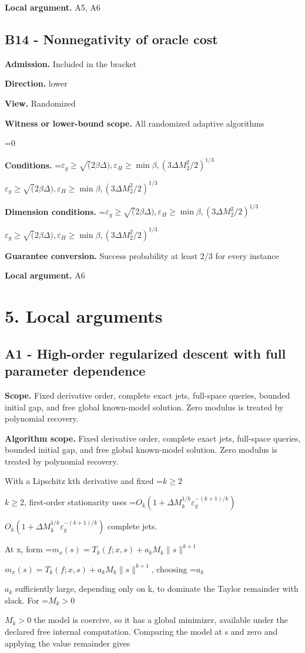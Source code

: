 \documentclass[10pt,a4paper]{article}
\newcommand{\AtlasMath}[1]{\par\begingroup\centering\setbox0=\hbox{$\displaystyle #1$}\ifdim\wd0>1.4\linewidth\typeout{ATLAS WIDE FORMULA: \the\wd0}\fi\ifdim\wd0>\linewidth\resizebox{\linewidth}{!}{\box0}\else\box0\fi\par\endgroup}
\newcommand{\AtlasInlineMath}[1]{\begingroup\setbox0=\hbox{$#1$}\ifdim\wd0>.4\linewidth\endgroup\AtlasMath{#1}\else\endgroup$#1$\fi}
\begin{document}
\textbf{Local argument.} A5, A6

\subsection{B14 - Nonnegativity of oracle cost}
\textbf{Admission.} Included in the bracket

\textbf{Direction.} lower

\textbf{View.} Randomized

\textbf{Witness or lower-bound scope.} All randomized adaptive algorithms

\AtlasMath{0}
\textbf{Conditions.} \AtlasInlineMath{\varepsilon_g\ge \sqrt(2\beta\Delta), \varepsilon_H\ge \min{\beta,(3\Delta M_2^2/2)^{1/3}}}

\textbf{Dimension conditions.} \AtlasInlineMath{\varepsilon_g\ge \sqrt(2\beta\Delta), \varepsilon_H\ge \min{\beta,(3\Delta M_2^2/2)^{1/3}}}

\textbf{Guarantee conversion.} Success probability at least 2/3 for every instance

\textbf{Local argument.} A6

\section{5. Local arguments}
\subsection{A1 - High-order regularized descent with full parameter dependence}
\textbf{Scope.} Fixed derivative order, complete exact jets, full-space queries, bounded initial gap, and free global known-model solution. Zero modulus is treated by polynomial recovery.

\textbf{Algorithm scope.} Fixed derivative order, complete exact jets, full-space queries, bounded initial gap, and free global known-model solution. Zero modulus is treated by polynomial recovery.

With a Lipschitz kth derivative and fixed \AtlasInlineMath{k\ge2}, first-order stationarity uses \AtlasInlineMath{O_k(1+\Delta M_k^{1/k}\varepsilon_g^{-(k+1)/k})} complete jets.

At x, form \AtlasInlineMath{m_x(s)=T_k(f;x,s)+a_kM_k\|s\|^{k+1}}, choosing \AtlasInlineMath{a_k} sufficiently large, depending only on k, to dominate the Taylor remainder with slack. For \AtlasInlineMath{M_k>0} the model is coercive, so it has a global minimizer, available under the declared free internal computation. Comparing the model at s and zero and applying the value remainder gives
\end{document}
